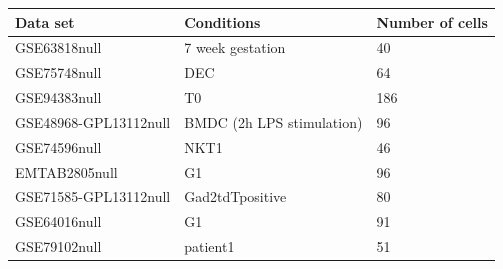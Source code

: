 \documentclass[aoas,preprint]{imsart}
\begin{document}
\begin{table}[b]
\footnotesize
\centering
\begin{tabular}{ |p{3cm}|p{5cm}|p{2cm}|}
\hline
 Data set & Conditions & Number of cells \\
\hline
\hline
GSE63818null & 7 week gestation  & 40 \\
\hline
GSE75748null & DEC  & 64\\
\hline
GSE94383null & T0 & 186\\
\hline
GSE48968-GPL13112null & BMDC (2h LPS stimulation) & 96\\
 \hline
 GSE74596null & NKT1 & 46\\
 \hline
 EMTAB2805null & G1 & 96\\
 \hline
GSE71585-GPL13112null &Gad2tdTpositive & 80 \\
\hline
GSE64016null & G1 & 91 \\
\hline
GSE79102null & patient1 & 51\\
\hline
\end{tabular}
\end{table}

\clearpage
\end{document}
